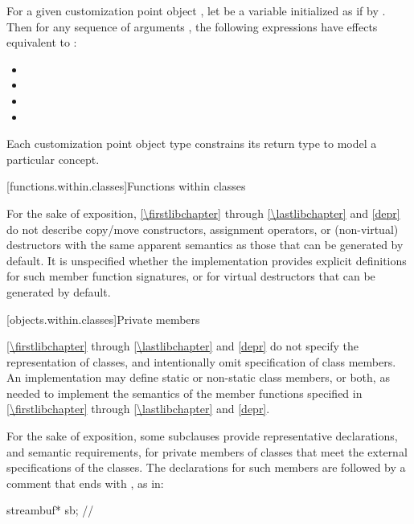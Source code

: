 \pnum
For a given customization point object ,
let  be a variable initialized as if by .
Then for any sequence of arguments ,
the following expressions have effects equivalent to :
\begin{itemize}
\item {}
\item {}
\item {}
\item {}
\end{itemize}

\pnum
Each customization point object type constrains its return type to model a
particular concept.

[functions.within.classes]{Functions within classes}

\pnum
For the sake of exposition, \ref{\firstlibchapter} through \ref{\lastlibchapter}
and \ref{depr} do not describe copy/move constructors, assignment
operators, or (non-virtual) destructors with the same apparent
semantics as those that can be generated
by default.
%
%
%
It is unspecified whether
the implementation provides explicit definitions for such member function
signatures, or for virtual destructors that can be generated by default.

[objects.within.classes]{Private members}

\pnum
\ref{\firstlibchapter} through \ref{\lastlibchapter} and
\ref{depr} do not specify the representation of classes, and intentionally
omit specification of class members. An implementation may
define static or non-static class members, or both, as needed to implement the
semantics of the member functions specified in \ref{\firstlibchapter}
through \ref{\lastlibchapter} and \ref{depr}.

\pnum
For the sake of exposition,
some subclauses provide representative declarations, and semantic requirements, for
private members of classes that meet the external specifications of the classes.
The declarations for such members are
followed by a comment that ends with \expos, as in:

\begin{codeblock}
streambuf* sb;      // \expos
\end{codeblock}

